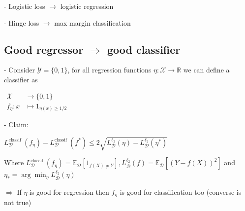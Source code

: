 - Logistic loss $\rightarrow$ logistic regression

- Hinge loss $\rightarrow$ max margin classification


\subsection*{Good regressor $\Rightarrow$ good classifier}
- Consider $\mathscr{Y}=\{0,1\}$, for all regression functions $\eta: \mathscr{X} \rightarrow \mathbb{R}$ we can define a classifier as

$
\begin{aligned}
\mathscr{X} & \rightarrow\{0,1\} \\
f_{\eta}: x & \mapsto 1_{\eta(x) \geq 1 / 2}
\end{aligned}
$

- Claim:

$
L_{\mathscr{D}}^{\text {classif }}\left(f_{\eta}\right)-L_{\mathscr{D}}^{\text {classif }}\left(f^{*}\right) \leq 2 \sqrt{L_{\mathscr{D}}^{\ell_{2}}(\eta)-L_{\mathscr{D}}^{\ell_{2}}\left(\eta^{*}\right)}
$

Where $L_{\mathscr{D}}^{\text {classif }}\left(f_{\eta}\right)=\mathbb{E}_{\mathscr{D}}\left[1_{f(X) \neq Y}\right], L_{\mathscr{D}}^{\ell_{2}}(f)=\mathbb{E}_{\mathscr{D}}\left[(Y-f(X))^{2}\right]$ and $\eta_{*}=\arg \min _{\eta} L_{\mathscr{D}}^{\ell_{2}}(\eta)$

$\Rightarrow$ If $\eta$ is good for regression then $f_{\eta}$ is good for classification too (converse is not true)

